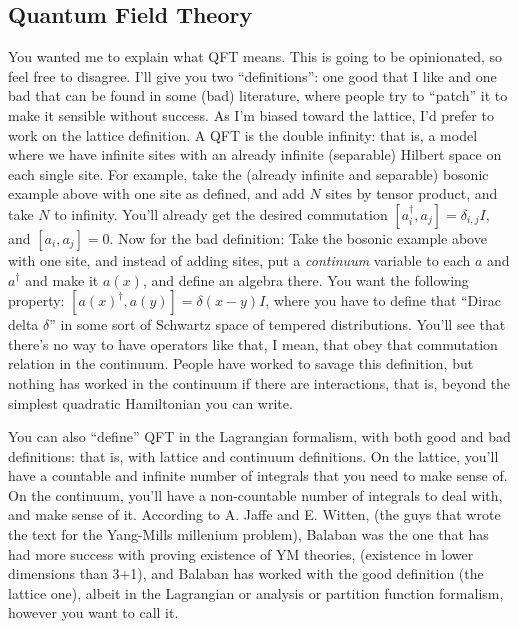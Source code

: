  	 \subsection{Quantum Field Theory}
 	 You wanted me to explain what QFT means. This is going to be opinionated, so feel free to disagree.
 	 I'll give you two ``definitions'': one good that I like and one bad that can be found in some (bad) literature,
 	 where people try to ``patch'' it to make it sensible without success. As I'm biased toward the lattice, I'd prefer to work on the lattice definition.
 	 A QFT is the double infinity: that is, a model where we have infinite sites with an already infinite (separable) Hilbert space on each single site.
 	 For example, take the (already infinite and separable) bosonic example above with one site as defined, and add $N$ sites by tensor product, and take $N$ to infinity. You'll already get the desired commutation $[a_i^\dagger,a_j]=\delta_{i,j}I$, and $[a_i, a_j]=0$.
 	 Now for the bad definition: Take the bosonic example above with one site, and instead of adding sites, put a \emph{continuum} variable to each
 	 $a$ and $a^\dagger$ and make it $a(x)$, and define an algebra there. You want the following property: $[a(x)^\dagger, a(y)]=\delta(x-y)I$, where you
 	 have to define that ``Dirac delta $\delta$'' in some sort of Schwartz space of tempered distributions. You'll see that there's no way
 	 to have operators like that, I mean, that obey that commutation relation in the continuum. People have worked to savage this definition, but nothing has worked in the continuum
 	 if there are interactions, that is, beyond the simplest quadratic Hamiltonian you can write.
 
 	 You can also ``define'' QFT in the Lagrangian formalism, with both good and bad definitions: that is, with lattice and continuum definitions.
 	 On the lattice, you'll have a countable and infinite number of integrals that you need to make sense of.
 	 On the continuum, you'll have a non-countable number of integrals to deal with, and make sense of it.
 	 According to A. Jaffe and E. Witten, (the guys that wrote the text for the Yang-Mills millenium problem), Balaban was the one that has had
 	 more success with proving existence of YM theories, (existence in lower dimensions than 3+1), and Balaban has worked with the good definition
 	 (the lattice one), albeit in the Lagrangian or analysis or partition function formalism, however you want to call it.
 

